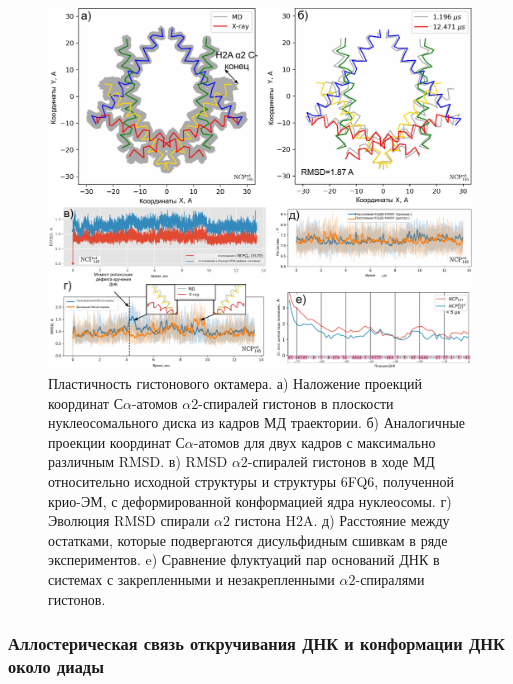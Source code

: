 \begin{figure} [H]
    \centering
    \includegraphics[width=\textwidth]{images/p2/10ms/fig7.pdf}
    \caption[Пластичность гистонового октамера]{Пластичность гистонового октамера. а) Наложение проекций координат С$\alpha$-атомов $\alpha 2$-спиралей гистонов в плоскости нуклеосомального диска из кадров МД траектории. б) Аналогичные проекции координат С$\alpha$-атомов для двух кадров с максимально различным RMSD. в) RMSD $\alpha 2$-спиралей гистонов в ходе МД относительно исходной структуры и структуры 6FQ6, полученной крио-ЭМ, с деформированной конформацией ядра нуклеосомы. г) Эволюция RMSD спирали $\alpha 2$ гистона H2A. д) Расстояние между остатками, которые подвергаются дисульфидным сшивкам в ряде экспериментов. e) Сравнение флуктуаций пар оснований ДНК в системах с закрепленными и незакрепленными $\alpha 2$-спиралями гистонов.}
    \label{fig:p2_3:f7}
\end{figure}

\subsubsection{Аллостерическая связь откручивания ДНК и конформации ДНК около диады}

